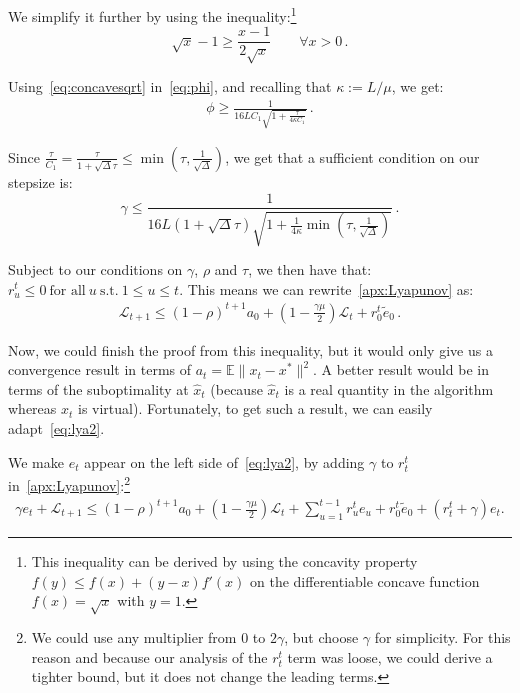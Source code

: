 \documentclass[twoside]{article}
\newcommand{\stepsize}{\gamma}
\newcommand{\strongconvex}{\mu}
\newcommand{\overlap}{\tau}
\newcommand{\contraction}{\rho}
\newcommand{\sparsity}{\Delta}
\newcommand{\lipschitz}{L}
\newcommand{\lyapunov}{\mathcal{L}}
\newcommand{\E}{\mathbb{E}}
\begin{document}
We simplify it further by using the inequality:\footnote{This inequality can be derived by using the concavity property $f(y) \leq f(x) + (y-x) f'(x)$ on the differentiable concave function $f(x)=\sqrt{x}$ with $y=1$.}
\begin{equation}\label{eq:concavesqrt}
\sqrt{x} - 1 \geq \frac{x - 1}{2 \sqrt{x}}  \qquad \forall x > 0 \, .
\end{equation}

Using~\eqref{eq:concavesqrt} in~\eqref{eq:phi}, and recalling that $\kappa := \lipschitz / \strongconvex$, we get:
\begin{align}
\phi \geq \frac{1}{16\lipschitz C_1 \sqrt{1 + \frac{\overlap}{4\kappa C_1}}} \, .
\end{align}

Since $\frac{\overlap}{C_1} = \frac{\overlap}{1 + \sqrt{\sparsity}\overlap} \leq \min(\overlap, \frac{1}{\sqrt{\sparsity}})$, we get that a sufficient condition on our stepsize is:
\begin{equation}
\stepsize \leq \frac{1}{16\lipschitz (1 + \sqrt{\sparsity} \overlap) \sqrt{1 + \frac{1}{4\kappa} \min(\overlap, \frac{1}{\sqrt{\sparsity}})}}  \, .
\end{equation}

Subject to our conditions on $\stepsize$, $\contraction$ and $\overlap$, we then have that: $r_u^t \leq 0\ \text{for all}\ u\ \text{s.t.}\ 1 \leq u \leq t$. 
This means we can rewrite~\eqref{apx:Lyapunov} as:
\begin{align}\label{eq:lya2}
\lyapunov_{t+1} \leq (1 - \contraction)^{t+1}a_0 + (1-\frac{\stepsize\strongconvex}{2})\lyapunov_t + r_0^t \tilde e_0  \, .
\end{align}

Now, we could finish the proof from this inequality, but it would only give us a convergence result in terms of $a_t = \E \|x_t - x^*\|^2$. A better result would be in terms of the suboptimality at $\hat x_t$ (because $\hat x_t$ is a real quantity in the algorithm whereas $x_t$ is virtual). Fortunately, to get such a result, we can easily adapt~\eqref{eq:lya2}.

We make $e_t$ appear on the left side of~\eqref{eq:lya2}, by adding $\stepsize$ to $r_t^t$ in~\eqref{apx:Lyapunov}:\footnote{We could use any multiplier from $0$ to $2\stepsize$, but choose $\stepsize$ for simplicity. For this reason and because our analysis of the $r_t^t$ term was loose, we could derive a tighter bound, but it does not change the leading terms.}
\begin{align}\label{eq:newlyapunov}
\stepsize e_t + \lyapunov_{t+1} \leq (1 - \contraction)^{t+1}a_0 + (1-\frac{\stepsize\strongconvex}{2})\lyapunov_t + \sum_{u=1}^{t-1} r_u^t e_u + r_0^t \tilde e_0 + (r_t^t + \stepsize)e_t .
\end{align}
\end{document}
